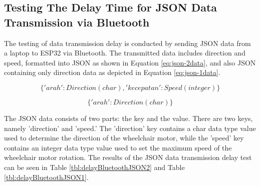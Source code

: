 \subsection{Testing The Delay Time for JSON Data Transmission via Bluetooth}

The testing of data transmission delay is conducted by sending JSON data from a laptop to ESP32 via Bluetooth. The transmitted data includes direction and speed, formatted into JSON as shown in Equation \ref{eq:json-2data}, and also JSON containing only direction data as depicted in Equation \ref{eq:json-1data}.

\begin{equation}
  \label{eq:json-2data}
    \{'arah': Direction(char), 'kecepatan': Speed(integer)\}
\end{equation}

\begin{equation}
  \label{eq:json-1data}
    \{'arah': Direction(char)\}
\end{equation}

The JSON data consists of two parts: the key and the value. There are two keys, namely 'direction' and 'speed.' The 'direction' key contains a char data type value used to determine the direction of the wheelchair motor, while the 'speed' key contains an integer data type value used to set the maximum speed of the wheelchair motor rotation. The results of the JSON data transmission delay test can be seen in Table \ref{tbl:delayBluetoothJSON2} and Table \ref{tbl:delayBluetoothJSON1}.

